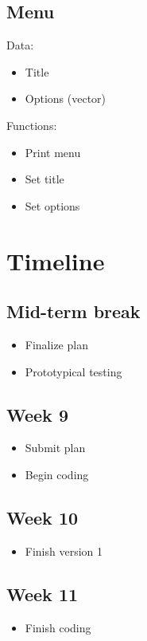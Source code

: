\documentclass{article}
\begin{document}
  \subsection{Menu}
  Data:
  \begin{itemize}
    \item Title
    \item Options (vector)
  \end{itemize}
  Functions:
  \begin{itemize}
    \item Print menu
    \item Set title
    \item Set options
  \end{itemize}
  
  \pagebreak
  
  \section{Timeline}
  
  \subsection*{Mid-term break}
  \begin{itemize}
    \item Finalize plan
    \item Prototypical testing
  \end{itemize}
  
  \subsection*{Week 9}
  \begin{itemize}
    \item Submit plan
    \item Begin coding
  \end{itemize}
  
  \subsection*{Week 10}
  \begin{itemize}
    \item Finish version 1
  \end{itemize}
  
  \subsection*{Week 11}
  \begin{itemize}
    \item Finish coding
  \end{itemize}
  
\end{document}
